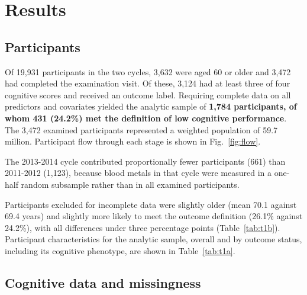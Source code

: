 \documentclass[12pt]{article}
\begin{document}
\section*{Results}

\subsection*{Participants}

Of 19,931 participants in the two cycles, 3,632 were aged 60 or older and 3,472 had completed the examination visit. Of these, 3,124 had at least three of four cognitive scores and received an outcome label. Requiring complete data on all predictors and covariates yielded the analytic sample of \textbf{1,784 participants, of whom 431 (24.2\%) met the definition of low cognitive performance}. The 3,472 examined participants represented a weighted population of 59.7 million. Participant flow through each stage is shown in Fig.~\ref{fig:flow}.

The 2013-2014 cycle contributed proportionally fewer participants (661) than 2011-2012 (1,123), because blood metals in that cycle were measured in a one-half random subsample rather than in all examined participants.

Participants excluded for incomplete data were slightly older (mean 70.1 against 69.4 years) and slightly more likely to meet the outcome definition (26.1\% against 24.2\%), with all differences under three percentage points (Table~\ref{tab:t1b}). Participant characteristics for the analytic sample, overall and by outcome status, including its cognitive phenotype, are shown in Table~\ref{tab:t1a}.

\subsection*{Cognitive data and missingness}
\end{document}
